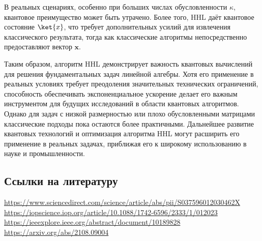 В реальных сценариях, особенно при больших числах обусловленности \( \kappa \), квантовое преимущество может быть утрачено. Более того, HHL даёт квантовое состояние \( \ket{x} \), что требует дополнительных усилий для извлечения классического результата, тогда как классические алгоритмы непосредственно предоставляют вектор \( \mathbf{x} \).

\textbf{ }

Таким образом, алгоритм HHL демонстрирует важность квантовых вычислений для решения фундаментальных задач линейной алгебры. Хотя его применение в реальных условиях требует преодоления значительных технических ограничений, способность обеспечивать экспоненциальное ускорение делает его важным инструментом для будущих исследований в области квантовых алгоритмов. Однако для задач с низкой размерностью или плохо обусловленными матрицами классические подходы пока остаются более практичными. Дальнейшее развитие квантовых технологий и оптимизация алгоритма HHL могут расширить его применение в реальных задачах, приближая его к широкому использованию в науке и промышленности.


\subsection*{Ссылки на литературу}

\url{https://www.sciencedirect.com/science/article/abs/pii/S037596012030462X}
\url{https://iopscience.iop.org/article/10.1088/1742-6596/2333/1/012023}
\url{https://ieeexplore.ieee.org/abstract/document/10189828}\\
\url{https://arxiv.org/abs/2108.09004}